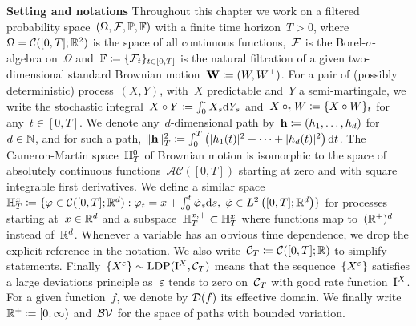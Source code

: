 \textbf{Setting and notations} Throughout this chapter we work on a filtered probability space~$(\Omega, \mathcal{F}, \mathbb{P}, \mathbb{F})$ with a finite time horizon~$T>0$, where~$\Omega = \mathcal{C}([0,T]; \mathbb{R}^2)$ is the space of all continuous functions,~$\mathcal{F}$ is the Borel-$\sigma$-algebra on~$\Omega$ and~$\mathbb{F}\coloneqq\{\mathcal{F}_t\}_{t\in[0,T]}$ is the natural filtration of a given two-dimensional standard Brownian motion~$\boldsymbol{\mathrm{W}} \coloneqq (W, W^{\perp})$. 
For a pair of (possibly deterministic) process~$(X,Y)$, with~$X$ predictable and~$Y$ a semi-martingale, 
we write the stochastic integral~$X\circ Y \coloneqq \int_{0}^{\cdot} X_s \mathrm{d} Y_s$ and~$X\circ_{t} W \coloneqq \{X\circ W\}_t$ for any~$t\in[0,T]$. We denote any~$d$-dimensional path by~${\boldsymbol{\mathrm{h}}\coloneqq (h_1,\dots,h_d)}$ for~$d\in\mathbb{N}$, 
and for such a path, ${\|\boldsymbol{\mathrm{h}}\|_T^2 \coloneqq \int_{0}^{T}\left(|h_1(t)|^2+\dots + |h_d(t)|^2\right)\mathrm{d} t}$. 
The Cameron-Martin space~$\mathbb{H}^0_T$ of Brownian motion is isomorphic to the space of absolutely continuous functions~$\mathcal{AC}([0, T])$ starting at zero and with square integrable first derivatives.
We define a similar space $\mathbb{H}^{x}_T \coloneqq \{\varphi \in \mathcal{C}([0,T]; \mathbb{R}^d): \varphi_{t}=x+\int_{0}^{t} \dot{\varphi}_{s} \mathrm{d} s, \; \dot{\varphi} \in L^{2}\left([0, T] ; \mathbb{R}^{d}\right)\}$ for processes starting at~$x\in\mathbb{R}^d$ and a subspace~$\mathbb{H}_T^{x,+}\subset\mathbb{H}_T^x$ where functions map to~$(\mathbb{R}^{+})^{d}$ instead of~$\mathbb{R}^d$. 
Whenever a variable has an obvious time dependence, we drop the explicit reference in the notation.
We also write~$\mathcal{C}_T\coloneqq\mathcal{C}([0,T];\mathbb{R})$ to simplify statements.
Finally~$\{X^\varepsilon\}\sim\mathrm{LDP}(\mathrm{I}^{X}, \mathcal{C}_T)$ means that the sequence~$\{X^\varepsilon\}$ satisfies a large deviations principle as~$\varepsilon$ tends to zero on~$\mathcal{C}_T$ with good rate function~$\mathrm{I}^{X}$.
For a given function~$f$, we denote by 
$\mathcal{D}(f)$ its effective domain.
We finally write
$\mathbb{R}^+\coloneqq[0,\infty)$ and~$\mathcal{BV}$ for the space of paths with bounded variation.

